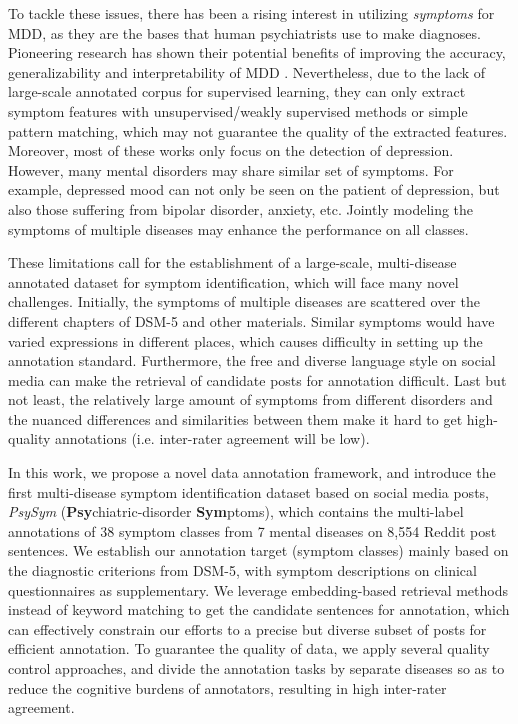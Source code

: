 To tackle these issues, there has been a rising interest in utilizing \textit{symptoms} for MDD, as they are the bases that human psychiatrists use to make diagnoses. Pioneering research has shown their potential benefits of improving the accuracy, generalizability and interpretability of MDD \citep{lee2021micromodels,nguyen2022improving,zhang22risky}. Nevertheless, due to the lack of large-scale annotated corpus for supervised learning, they can only extract symptom features with unsupervised/weakly supervised methods or simple pattern matching, which may not guarantee the quality of the extracted features. Moreover, most of these works only focus on the detection of depression. However, many mental disorders may share similar set of symptoms. For example, depressed mood can not only be seen on the patient of depression, but also those suffering from bipolar disorder, anxiety, etc. Jointly modeling the symptoms of multiple diseases may enhance the performance on all classes. 

These limitations call for the establishment of a large-scale, multi-disease annotated dataset for symptom identification, which will face many novel challenges. Initially, the symptoms of multiple diseases are scattered over the different chapters of DSM-5 and other materials. Similar symptoms would have varied expressions in different places, which causes difficulty in setting up the annotation standard. Furthermore, the free and diverse language style on social media \citep{yadav2020identifying} can make the retrieval of candidate posts for annotation difficult. Last but not least, the relatively large amount of symptoms from different disorders and the nuanced differences and similarities between them make it hard to get high-quality annotations (i.e. inter-rater agreement will be low).  

In this work, we propose a novel data annotation framework, and introduce the first multi-disease symptom identification dataset based on social media posts, \textit{PsySym} (\textbf{Psy}chiatric-disorder \textbf{Sym}ptoms), which contains the multi-label annotations of 38 symptom classes from 7 mental diseases on 8,554 Reddit post sentences. We establish our annotation target (symptom classes) mainly based on the diagnostic criterions from DSM-5, with symptom descriptions on clinical questionnaires as supplementary. We leverage embedding-based retrieval methods \citep{reimers-2019-sentence-bert} instead of keyword matching to get the candidate sentences for annotation, which can effectively constrain our efforts to a precise but diverse subset of posts for efficient annotation. To guarantee the quality of data, we apply several quality control approaches, and divide the annotation tasks by separate diseases so as to reduce the cognitive burdens of annotators, resulting in high inter-rater agreement.

